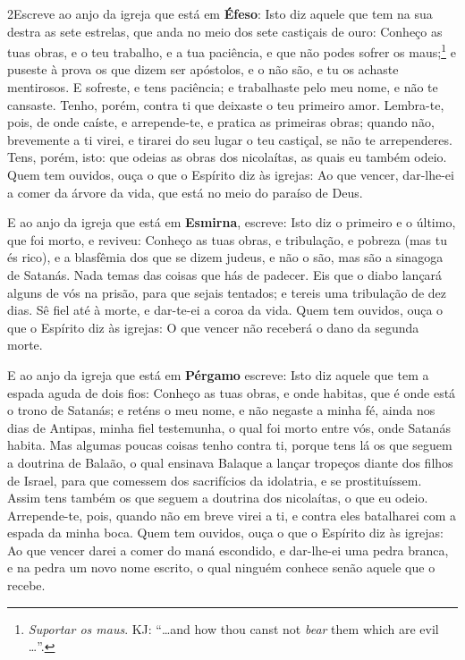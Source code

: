 \medskip

\lettrine{2} Escreve ao anjo da igreja que está em
\textbf{Éfeso}: Isto diz aquele que tem na sua destra as sete
estrelas, que anda no meio dos sete castiçais de ouro: Conheço
as tuas obras, e o teu trabalho, e a tua paciência, e que não podes
sofrer os maus;\footnote{\emph{Suportar os maus}. KJ: ``\ldots and
how thou canst not \emph{bear} them which are evil \ldots''.} e
puseste à prova os que dizem ser apóstolos, e o não são, e tu os
achaste mentirosos. E sofreste, e tens paciência; e trabalhaste
pelo meu nome, e não te cansaste. Tenho, porém, contra ti que
deixaste o teu primeiro amor. Lembra-te, pois, de onde caíste, e
arrepende-te, e pratica as primeiras obras; quando não, brevemente a
ti virei, e tirarei do seu lugar o teu castiçal, se não te
arrependeres. Tens, porém, isto: que odeias as obras dos
nicolaítas, as quais eu também odeio. Quem tem ouvidos, ouça o
que o Espírito diz às igrejas: Ao que vencer, dar-lhe-ei a comer da
árvore da vida, que está no meio do paraíso de Deus.

E ao anjo da igreja que está em \textbf{Esmirna}, escreve: Isto
diz o primeiro e o último, que foi morto, e reviveu: Conheço as
tuas obras, e tribulação, e pobreza (mas tu  és rico), e a blasfêmia
dos que se dizem judeus, e não o são, mas são a sinagoga de Satanás.
Nada temas das coisas que hás de padecer. Eis que o diabo
lançará alguns de vós na prisão, para que sejais tentados; e tereis
uma tribulação de dez dias. Sê fiel até à morte, e dar-te-ei a coroa
da vida. Quem tem ouvidos, ouça o que o Espírito diz às
igrejas: O  que vencer não receberá o dano da segunda morte.

E ao anjo da igreja que está em \textbf{Pérgamo} escreve: Isto
diz aquele que tem a espada aguda de dois fios: Conheço as
tuas obras, e onde habitas, que é onde está o trono de Satanás; e
reténs o meu nome, e não negaste a minha fé, ainda nos dias de
Antipas, minha fiel testemunha, o qual foi morto entre vós, onde
Satanás habita. Mas algumas poucas coisas tenho contra ti,
porque tens lá os que seguem a doutrina de Balaão, o qual ensinava
Balaque a lançar tropeços diante dos filhos de Israel, para que
comessem dos sacrifícios da idolatria, e se prostituíssem.
Assim  tens também os que seguem a doutrina dos nicolaítas, o
que eu odeio. Arrepende-te, pois, quando não em breve virei a
ti, e contra eles batalharei com a espada da minha boca. Quem
tem ouvidos, ouça o que o Espírito diz às igrejas: Ao que vencer
darei a comer do maná escondido, e dar-lhe-ei uma pedra branca, e na
pedra um novo nome escrito, o qual ninguém conhece senão aquele que
o recebe.

